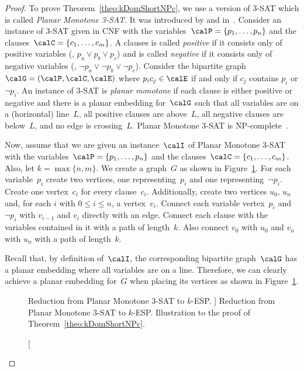 \begin{proof}
To prove Theorem~\ref{theo:kDomShortNPc}, we use a version of 3-SAT which is called \emph{Planar Monotone 3-SAT}.
It was introduced by  and  in~\cite{deBergKhosra2010}.
Consider an instance of 3-SAT given in CNF with the variables~$\calP = \{ p_1, \ldots, p_n \}$ and the clauses~$\calC = \{ c_1, \ldots, c_m \}$.
A clauses is called \emph{positive} if it consists only of positive variables (\ie, $p_a \lor p_b \lor p_c$) and is called \emph{negative} if it consists only of negative variables (\ie, $\neg p_a \lor \neg p_b \lor \neg p_c$).
Consider the bipartite graph~$\calG = (\calP, \calC, \calE)$ where $p_ic_j \in \calE$ if and only if $c_j$ contains $p_i$ or $\neg p_i$.
An instance of 3-SAT is \emph{planar monotone} if each clause is either positive or negative and there is a planar embedding for~$\calG$ such that all variables are on a (horizontal) line~$L$, all positive clauses are above~$L$, all negative clauses are below~$L$, and no edge is crossing~$L$.
Planar Monotone 3-SAT is NP-complete~\cite{deBergKhosra2010}.

Now, assume that we are given an instance~$\calI$ of Planar Monotone 3-SAT with the variables~$\calP = \{ p_1, \ldots, p_n \}$ and the clauses~$\calC = \{ c_1, \ldots, c_m \}$.
Also, let $k = \max \{ n, m \}$.
We create a graph~$G$ as shown in Figure~\ref{fig:kDomShortNPc}.
For each variable~$p_i$ create two vertices, one representing~$p_i$ and one representing~$\neg p_i$.
Create one vertex~$c_i$ for every clause~$c_i$.
Additionally, create two vertices $u_0$, $u_n$ and, for each $i$ with $0 \leq i \leq n$, a vertex~$v_i$.
Connect each variable vertex~$p_i$ and $\neg p_i$ with $v_{i-1}$ and $v_i$ directly with an edge.
Connect each clause with the variables contained in it with a path of length~$k$.
Also connect $v_0$ with $u_0$ and $v_n$ with $u_n$ with a path of length~$k$.

Recall that, by definition of~$\calI$, the corresponding bipartite graph~$\calG$ has a planar embedding where all variables are on a line.
Therefore, we can clearly achieve a planar embedding for~$G$ when placing its vertices as shown in Figure~\ref{fig:kDomShortNPc}.

\begin{figure}
    [htb]
    \centering
    
    \caption
    [%
        Reduction from Planar Monotone 3-SAT to $k$-ESP.
    ]
    {
        Reduction from Planar Monotone 3-SAT to $k$-ESP.
        Illustration to the proof of Theorem~\ref{theo:kDomShortNPc}.
    }
    \label{fig:kDomShortNPc}
\end{figure}


\end{proof}
